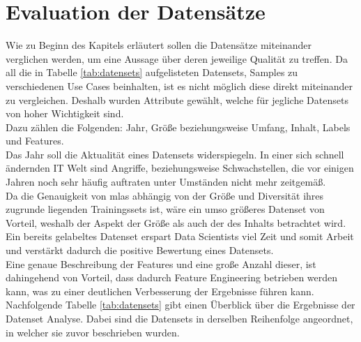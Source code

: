 \documentclass[
    12pt, %
    DIV10,
    ngerman, %
    a4paper, %
    oneside, %
    titlepage, %
    parskip=half, %
    headings=normal, %
    listof=totoc, %
    bibliography=totoc, %
    index=totoc, %
    captions=tableheading, %
    final %
]{scrreprt}
\begin{document}
\section{Evaluation der Datensätze}
Wie zu Beginn des Kapitels erläutert sollen die Datensätze miteinander verglichen werden, um eine Aussage über deren jeweilige Qualität zu treffen. Da all die in Tabelle \ref{tab:datensets} aufgelisteten Datensets, Samples zu verschiedenen Use Cases beinhalten, ist es nicht möglich diese direkt miteinander zu vergleichen. Deshalb wurden Attribute gewählt, welche für jegliche Datensets von hoher Wichtigkeit sind.\\ Dazu zählen die Folgenden: Jahr, Grö{\ss}e beziehungsweise Umfang, Inhalt, Labels und Features.\\
Das Jahr soll die Aktualität eines Datensets widerspiegeln. In einer sich schnell ändernden IT Welt sind Angriffe, beziehungsweise Schwachstellen, die vor einigen Jahren noch sehr häufig auftraten unter Umständen nicht mehr zeitgemä{\ss}.\\
Da die Genauigkeit von \ac{mlas} abhängig von der Grö{\ss}e und Diversität ihres zugrunde liegenden Trainingssets ist, wäre ein umso grö{\ss}eres Datenset von Vorteil, weshalb der Aspekt der Grö{\ss}e als auch der des Inhalts betrachtet wird.\\
Ein bereits gelabeltes Datenset erspart Data Scientists viel Zeit und somit Arbeit und verstärkt dadurch die positive Bewertung eines Datensets.\\
Eine genaue Beschreibung der Features und eine gro{\ss}e Anzahl dieser, ist dahingehend von Vorteil, dass dadurch Feature Engineering betrieben werden kann, was zu einer deutlichen Verbesserung der Ergebnisse führen kann.\\
Nachfolgende Tabelle \ref{tab:datensets} gibt einen Überblick über die Ergebnisse der Datenset Analyse. Dabei sind die Datensets in derselben Reihenfolge angeordnet, in welcher sie zuvor beschrieben wurden.
\end{document}
